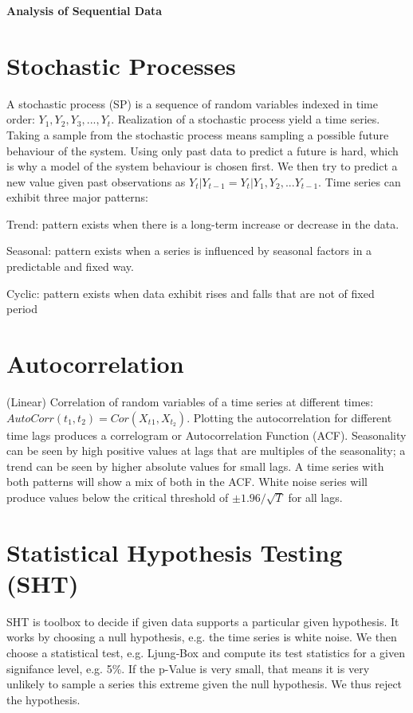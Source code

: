 \documentclass[10pt, a4paper]{article}
\begin{document}
\textbf{Analysis of Sequential Data}

\section{Stochastic Processes}
A stochastic process (SP) is a sequence of random variables indexed in time order: $ Y_1, Y_2, Y_3, ..., Y_t $.
Realization of a stochastic process yield a time series.
Taking a sample from the stochastic process means sampling a possible future behaviour of the system.
Using only past data to predict a future is hard, which is why a model of the system behaviour is chosen first.
We then try to predict a new value given past observations as $ Y_t | Y_{t-1} = Y_t | Y_1, Y_2, ... Y_{t-1} $. Time series can exhibit three major patterns:

Trend: pattern exists when there is a long-term increase or decrease in the data.

Seasonal: pattern exists when a series is influenced by seasonal factors in a predictable and fixed way.

Cyclic: pattern exists when data exhibit rises and falls that are not of fixed period

\section{Autocorrelation}
(Linear) Correlation of random variables of a time series at different times: $ AutoCorr(t_1, t_2) = Cor(X_t{_1}, X_{t_2}) $.
Plotting the autocorrelation for different time lags produces a correlogram or Autocorrelation Function (ACF).
Seasonality can be seen by high positive values at lags that are multiples of the seasonality; a trend can be seen by higher absolute values for small lags.
A time series with both patterns will show a mix of both in the ACF. White noise series will produce values below the critical threshold of $ \pm 1.96 / \sqrt{T} $ for all lags.

\section{Statistical Hypothesis Testing (SHT)}
SHT is toolbox to decide if given data supports a particular given hypothesis.
It works by choosing a null hypothesis, e.g. the time series is white noise.
We then choose a statistical test, e.g. Ljung‐Box and compute its test statistics for a given signifance level, e.g. 5\%.
If the p-Value is very small, that means it is very unlikely to sample a series this extreme given the null hypothesis. We thus reject the hypothesis.
\end{document}
